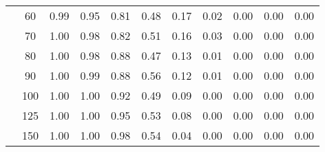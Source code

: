 \begin{table}[t]
\begin{center}
\begin{subtable}[c]{\textwidth}
\begin{center}
\begin{tabular}{rcccccccccc}
                                        & \multicolumn{1}{c|}{60}  & \num{0.99}  & \num{0.95}  & \num{0.81}  & \num{0.48}  & \num{0.17}  & \num{0.02}  & \num{0.00}  & \num{0.00}  & \num{0.00}  \\
                                        & \multicolumn{1}{c|}{70}  & \num{1.00}  & \num{0.98}  & \num{0.82}  & \num{0.51}  & \num{0.16}  & \num{0.03}  & \num{0.00}  & \num{0.00}  & \num{0.00}  \\
                                        & \multicolumn{1}{c|}{80}  & \num{1.00}  & \num{0.98}  & \num{0.88}  & \num{0.47}  & \num{0.13}  & \num{0.01}  & \num{0.00}  & \num{0.00}  & \num{0.00}  \\
                                        & \multicolumn{1}{c|}{90}  & \num{1.00}  & \num{0.99}  & \num{0.88}  & \num{0.56}  & \num{0.12}  & \num{0.01}  & \num{0.00}  & \num{0.00}  & \num{0.00}  \\
                                        & \multicolumn{1}{c|}{100}  & \num{1.00}  & \num{1.00}  & \num{0.92}  & \num{0.49}  & \num{0.09}  & \num{0.00}  & \num{0.00}  & \num{0.00}  & \num{0.00}  \\
                                        & \multicolumn{1}{c|}{125}  & \num{1.00}  & \num{1.00}  & \num{0.95}  & \num{0.53}  & \num{0.08}  & \num{0.00}  & \num{0.00}  & \num{0.00}  & \num{0.00}  \\
                                        & \multicolumn{1}{c|}{150}  & \num{1.00}  & \num{1.00}  & \num{0.98}  & \num{0.54}  & \num{0.04}  & \num{0.00}  & \num{0.00}  & \num{0.00}  & \num{0.00}  \\
                                    \end{tabular}
            \end{center}
        \end{subtable}

        \vspace{5mm}


\end{center}
\end{table}
